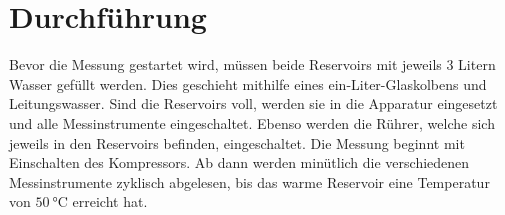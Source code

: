 \section{Durchführung}
\label{sec:Durchführung}
Bevor die Messung gestartet wird, müssen beide Reservoirs mit jeweils 3 Litern Wasser gefüllt werden.
Dies geschieht mithilfe eines ein-Liter-Glaskolbens und Leitungswasser. Sind die Reservoirs voll, werden
sie in die Apparatur eingesetzt und alle Messinstrumente eingeschaltet. Ebenso werden die Rührer, 
welche sich jeweils in den Reservoirs befinden, eingeschaltet. Die Messung beginnt mit 
Einschalten des Kompressors. Ab dann werden minütlich die verschiedenen Messinstrumente zyklisch abgelesen,
bis das warme Reservoir eine Temperatur von $\qty{50}{\celsius}$ erreicht hat. 
